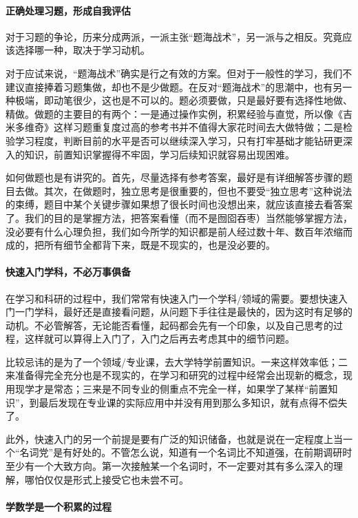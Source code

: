 \paragraph{正确处理习题，形成自我评估}

对于习题的争论，历来分成两派，一派主张“题海战术”，另一派与之相反。究竟应该选择哪一种，取决于学习动机。

对于应试来说，“题海战术”确实是行之有效的方案。但对于一般性的学习，我们不建议直接捧着习题集做，却也不是少做题。在反对“题海战术”的思潮中，也有另一种极端，即动笔很少，这也是不可以的。题必须要做，只是最好要有选择性地做、精做。做题的主要目的有两个：一是通过操作实例，积累经验与直觉，所以像《吉米多维奇》这样习题重复度过高的参考书并不值得大家花时间去大做特做；二是检验学习程度，判断目前的水平是否可以继续深入学习，只有打牢基础才能钻研更深入的知识，前置知识掌握得不牢固，学习后续知识就容易出现困难。

如何做题也是有讲究的。首先，尽量选择有参考答案，最好是有详细解答步骤的题目去做。其次，在做题时，独立思考是很重要的，但也不要受“独立思考”这种说法的束缚，题目中某个关键步骤如果想了很长时间也没想出来，就应该直接去看答案了。我们的目的是掌握方法，把答案看懂（而不是囫囵吞枣）当然能够掌握方法，没必要有什么心理负担，我们如今所学的知识都是前人经过数十年、数百年浓缩而成的，把所有细节全都背下来，既是不现实的，也是没必要的。

\paragraph{快速入门学科，不必万事俱备}

在学习和科研的过程中，我们常常有快速入门一个学科/领域的需要。要想快速入门一门学科，最好还是直接看问题，从问题下手往往是最快的，因为这时有足够的动机。不必管解答，无论能否看懂，起码都会先有一个印象，以及自己思考的过程，这样就可以算得上入门了，入门之后再去考虑其中的细节问题。

比较忌讳的是为了一个领域/专业课，去大学特学前置知识。一来这样效率低；二来准备得完全充分也是不现实的，在学习和研究的过程中经常会出现新的概念，现用现学才是常态；三来是不同专业的侧重点不完全一样，如果学了某样“前置知识”，到最后发现在专业课的实际应用中并没有用到那么多知识，就有点得不偿失了。

此外，快速入门的另一个前提是要有广泛的知识储备，也就是说在一定程度上当一个“名词党”是有好处的。不管怎么说，知道有一个名词比不知道强，在前期调研时至少有一个大致方向。第一次接触某一个名词时，不一定要对其有多么深入的理解，哪怕仅仅是形式上接受它也未尝不可。

\paragraph{学数学是一个积累的过程}

